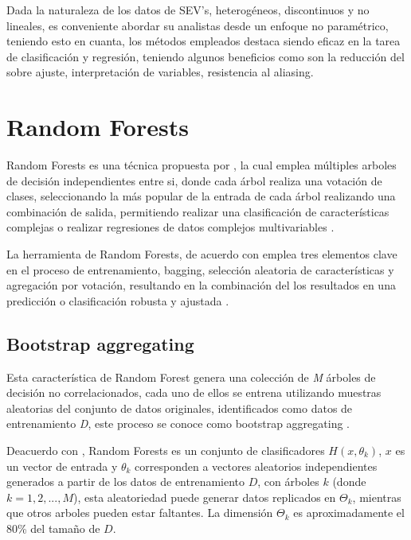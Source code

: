 	Dada la naturaleza de los datos de SEV's, heterogéneos, discontinuos y no lineales, es conveniente abordar su analistas desde un enfoque no paramétrico, teniendo esto en cuanta, los métodos empleados destaca siendo eficaz en la tarea de clasificación y regresión, teniendo algunos beneficios como son la reducción del sobre ajuste, interpretación de variables, resistencia al aliasing.
	
	\section{Random Forests} 
	
		Random Forests es una técnica propuesta por \citet{breiman2001}, la cual emplea múltiples arboles de decisión independientes entre si, donde cada árbol realiza una votación de clases, seleccionando la más popular de la entrada de cada árbol realizando una combinación de salida, permitiendo realizar una clasificación de características complejas o realizar regresiones de datos complejos multivariables \citep{breiman2001, lan2020}.
		
		La herramienta de Random Forests, de acuerdo con \citet{breiman2001} emplea tres elementos clave en el proceso de entrenamiento, bagging, selección aleatoria de características y agregación por votación, resultando en la combinación del los resultados en una predicción o clasificación robusta y ajustada \citep{lan2020}.
		
		\subsection{Bootstrap aggregating}
			
			
			Esta característica de Random Forest genera una colección de \textit{M} árboles de decisión no correlacionados, cada uno de ellos se entrena utilizando muestras aleatorias del conjunto de datos originales, identificados como datos de entrenamiento \textit{D}, este proceso se conoce como bootstrap aggregating \citep{breiman2001}.
			
			Deacuerdo con \citet{breiman2001}, Random Forests es un conjunto de clasificadores $H(x,\theta_{k})$, $x$ es un vector de entrada y $\theta_{k}$ corresponden a vectores aleatorios independientes generados a partir de los datos de entrenamiento $D$, con árboles $k$ (donde $k = 1, 2, ..., M$), esta aleatoriedad puede generar datos replicados en $\Theta_k$, mientras que otros arboles pueden estar faltantes. La dimensión $\Theta_k$ es aproximadamente el 80\% del tamaño de $D$.
			
